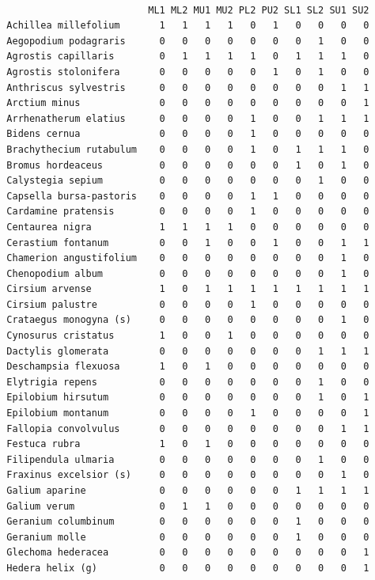 \documentclass[
  letterpaper,
  DIV=11,
  numbers=noendperiod]{scrreprt}
\begin{document}
\begin{verbatim}
                          
                           ML1 ML2 MU1 MU2 PL2 PU2 SL1 SL2 SU1 SU2
  Achillea millefolium       1   1   1   1   0   1   0   0   0   0
  Aegopodium podagraris      0   0   0   0   0   0   0   1   0   0
  Agrostis capillaris        0   1   1   1   1   0   1   1   1   0
  Agrostis stolonifera       0   0   0   0   0   1   0   1   0   0
  Anthriscus sylvestris      0   0   0   0   0   0   0   0   1   1
  Arctium minus              0   0   0   0   0   0   0   0   0   1
  Arrhenatherum elatius      0   0   0   0   1   0   0   1   1   1
  Bidens cernua              0   0   0   0   1   0   0   0   0   0
  Brachythecium rutabulum    0   0   0   0   1   0   1   1   1   0
  Bromus hordeaceus          0   0   0   0   0   0   1   0   1   0
  Calystegia sepium          0   0   0   0   0   0   0   1   0   0
  Capsella bursa-pastoris    0   0   0   0   1   1   0   0   0   0
  Cardamine pratensis        0   0   0   0   1   0   0   0   0   0
  Centaurea nigra            1   1   1   1   0   0   0   0   0   0
  Cerastium fontanum         0   0   1   0   0   1   0   0   1   1
  Chamerion angustifolium    0   0   0   0   0   0   0   0   1   0
  Chenopodium album          0   0   0   0   0   0   0   0   1   0
  Cirsium arvense            1   0   1   1   1   1   1   1   1   1
  Cirsium palustre           0   0   0   0   1   0   0   0   0   0
  Crataegus monogyna (s)     0   0   0   0   0   0   0   0   1   0
  Cynosurus cristatus        1   0   0   1   0   0   0   0   0   0
  Dactylis glomerata         0   0   0   0   0   0   0   1   1   1
  Deschampsia flexuosa       1   0   1   0   0   0   0   0   0   0
  Elytrigia repens           0   0   0   0   0   0   0   1   0   0
  Epilobium hirsutum         0   0   0   0   0   0   0   1   0   1
  Epilobium montanum         0   0   0   0   1   0   0   0   0   1
  Fallopia convolvulus       0   0   0   0   0   0   0   0   1   1
  Festuca rubra              1   0   1   0   0   0   0   0   0   0
  Filipendula ulmaria        0   0   0   0   0   0   0   1   0   0
  Fraxinus excelsior (s)     0   0   0   0   0   0   0   0   1   0
  Galium aparine             0   0   0   0   0   0   1   1   1   1
  Galium verum               0   1   1   0   0   0   0   0   0   0
  Geranium columbinum        0   0   0   0   0   0   1   0   0   0
  Geranium molle             0   0   0   0   0   0   1   0   0   0
  Glechoma hederacea         0   0   0   0   0   0   0   0   0   1
  Hedera helix (g)           0   0   0   0   0   0   0   0   0   1

\end{verbatim}
\end{document}
